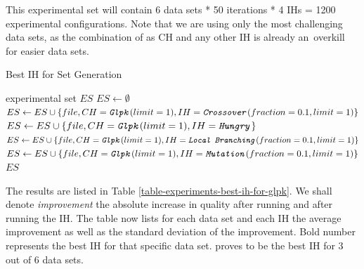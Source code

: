 This experimental set will contain 6 data sets * 50 iterations * 4 IHs = 1200 experimental configurations. Note that we are using only the most challenging data sets, as the combination of  as CH and any other IH is already an~overkill for easier data sets.\\

\begin{algorithm}
\caption{Best IH for  Set Generation}
\label{listing-experiment-best-ih-for-glpk}
\begin{algorithmic}
\ENSURE experimental set $ES$
\STATE $ES \gets \emptyset$
    	\STATE $ES \gets ES \cup \{file, CH = \texttt{\textit{Glpk}}(limit = 1), IH = \texttt{\textit{Crossover}}(fraction = 0.1, limit = 1)\}$
    	\STATE $ES \gets ES \cup \{file, CH = \texttt{\textit{Glpk}}(limit = 1), IH = \texttt{\textit{Hungry}}\}$
    	\STATE $ES \gets ES \cup \{file, CH = \texttt{\textit{Glpk}}(limit = 1), IH = \texttt{\textit{Local Branching}}(fraction = 0.1, limit = 1)\}$
    	\STATE $ES \gets ES \cup \{file, CH = \texttt{\textit{Glpk}}(limit = 1), IH = \texttt{\textit{Mutation}}(fraction = 0.1, limit = 1)\}$
  \ENDFOR
\ENDFOR
\RETURN $ES$
\end{algorithmic}
\end{algorithm}

The results are listed in Table \ref{table-experiments-best-ih-for-glpk}. We shall denote \textit{improvement} the absolute increase in quality after running  and after running the IH. The table now lists for each data set and each IH the average improvement as well as the standard deviation of the improvement. Bold number represents the best IH for that specific data set.  proves to be the best IH for 3 out of 6 data sets.


